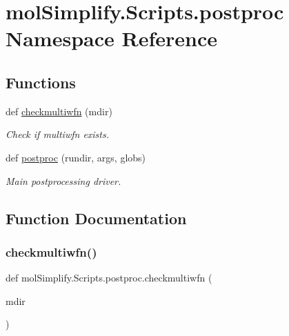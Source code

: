 \hypertarget{namespacemolSimplify_1_1Scripts_1_1postproc}{}\section{mol\+Simplify.\+Scripts.\+postproc Namespace Reference}
\label{namespacemolSimplify_1_1Scripts_1_1postproc}
\subsection*{Functions}
\begin{DoxyCompactItemize}
\item 
def \hyperlink{namespacemolSimplify_1_1Scripts_1_1postproc_a5eab2c179473fb9eab1cfbf8e4a2f3ce}{checkmultiwfn} (mdir)
\begin{DoxyCompactList}\small\item\em Check if multiwfn exists. \end{DoxyCompactList}\item 
def \hyperlink{namespacemolSimplify_1_1Scripts_1_1postproc_ae9b99342f9f702ba461981fee53bf8ef}{postproc} (rundir, args, globs)
\begin{DoxyCompactList}\small\item\em Main postprocessing driver. \end{DoxyCompactList}\end{DoxyCompactItemize}


\subsection{Function Documentation}
\mbox{\label{namespacemolSimplify_1_1Scripts_1_1postproc_a5eab2c179473fb9eab1cfbf8e4a2f3ce}} 
\subsubsection{\texorpdfstring{checkmultiwfn()}{checkmultiwfn()}}
{\footnotesize\ttfamily def mol\+Simplify.\+Scripts.\+postproc.\+checkmultiwfn (\begin{DoxyParamCaption}\item[{}]{mdir }\end{DoxyParamCaption})}



